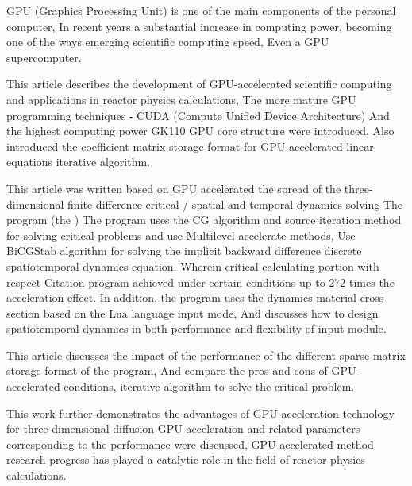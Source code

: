 
\begin{eabstract}
GPU (Graphics Processing Unit) is one of the main components of the personal computer,
In recent years a substantial increase in computing power, becoming one of the ways emerging scientific computing speed,
Even a GPU supercomputer.

This article describes the development of GPU-accelerated scientific computing and applications in reactor physics calculations,
The more mature GPU programming techniques - CUDA (Compute Unified Device Architecture)
And the highest computing power GK110 GPU core structure were introduced,
Also introduced the coefficient matrix storage format for GPU-accelerated linear equations iterative algorithm.

This article was written based on GPU accelerated the spread of the three-dimensional finite-difference critical / spatial and temporal dynamics solving
The program \ProgramName (the \ProgramFullName)
The program uses the CG algorithm and source iteration method for solving critical problems and use Multilevel accelerate methods,
Use BiCGStab algorithm for solving the implicit backward difference discrete spatiotemporal dynamics equation.
Wherein critical calculating portion with respect Citation program achieved under certain conditions up to 272 times the acceleration effect.
In addition, the \ProgramName program uses the dynamics material cross-section based on the Lua language input mode,
And discusses how to design spatiotemporal dynamics in both performance and flexibility of input module.

This article discusses the impact of the performance of the different sparse matrix storage format of the program,
And compare the pros and cons of GPU-accelerated conditions, iterative algorithm to solve the critical problem.

This work further demonstrates the advantages of GPU acceleration technology for three-dimensional diffusion
GPU acceleration and related parameters corresponding to the performance were discussed,
GPU-accelerated method research progress has played a catalytic role in the field of reactor physics calculations.
\end{eabstract}

